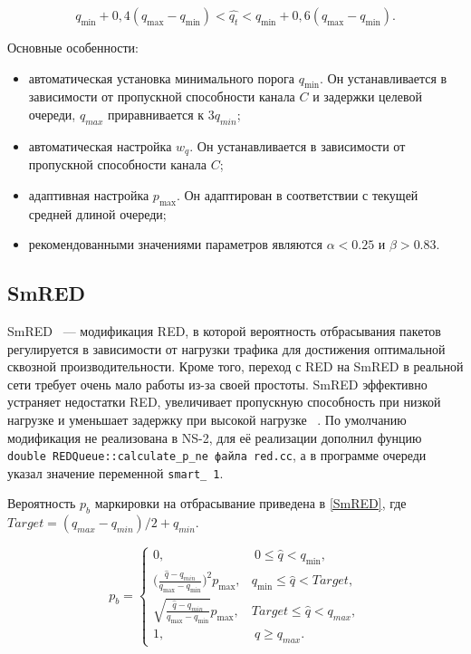\begin{equation}
\label{ad2}
q_{\min}+0,4(q_{\max}-q_{\min}) < \hat{q_t} < q_{\min}+0,6\left(q_{\max}-q_{\min}\right).
\end{equation}

Основные особенности: 
\begin{itemize}
\item автоматическая установка минимального порога $q_{\min}$. Он
  устанавливается в зависимости от пропускной способности канала $C$ и
  задержки целевой очереди, $q_{max}$ приравнивается к $3q_{min}$;
\item автоматическая настройка $w_{q}$. Он устанавливается в
  зависимости от пропускной способности канала $C$;
\item адаптивная настройка $p_{\max}$. Он адаптирован в соответствии с
  текущей средней длиной очереди;
\item рекомендованными значениями параметров являются $\alpha < 0.25 $ и $\beta > 0.83 $.
\end{itemize}


\subsection{SmRED}

SmRED ~--- модификация RED, в которой
вероятность отбрасывания пакетов регулируется в зависимости от нагрузки трафика для достижения оптимальной сквозной производительности.
Кроме того, переход с RED на SmRED в реальной сети требует очень мало работы из-за своей простоты. SmRED эффективно устраняет недостатки
RED, увеличивает пропускную способность при низкой нагрузке и уменьшает задержку при высокой нагрузке ~\cite{SmRED}. По умолчанию модификация не реализована в NS-2, для её реализации дополнил фунцию \verb|double REDQueue::calculate_p_ne файла red.cc|, а в программе очереди указал значение переменной \verb|smart_ 1|. 

Вероятность $p_{b}$ маркировки на отбрасывание приведена в \eqref{SmRED}, где $ Target = (q_{max} - q_{min})/2 + q_{min} $.

\begin{equation}
\label{SmRED}
p_{b} = \begin{cases}
        0, &  \ 0 \leqslant \hat{q} < q_{\min},
        \\
        ({\frac{\hat{q} - q_{min}}{q_{\max} - q_{\min}})^2} {p_{\max}}, &  q_{\min} \leqslant  \hat{q} < {Target},
        \\
        \sqrt{{\frac{\hat{q} - q_{min}}{q_{\max} - q_{\min}}}} {p_{\max}}, & {Target} \leqslant  \hat{q} < q_{max},
        \\
        1, &  \ \hat{q} \geqslant q_{max}.
\end{cases}
\end{equation}
 

